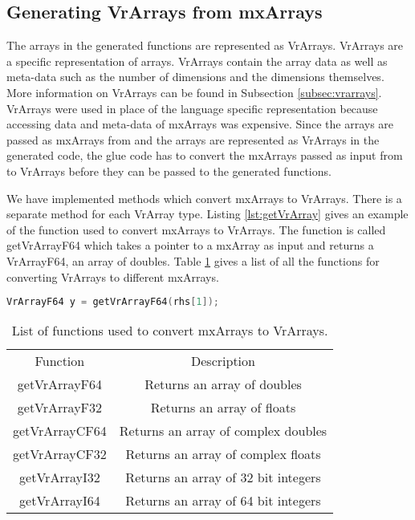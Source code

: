 \subsection{Generating VrArrays from mxArrays}
The arrays in the generated functions are represented as VrArrays. VrArrays are a \velocty specific representation of arrays. VrArrays contain the array data as well as meta-data such as the number of dimensions and the dimensions themselves. More information on VrArrays can be found in Subsection \ref{subsec:vrarrays}. VrArrays were used in place of the language specific representation because accessing data and meta-data of mxArrays was expensive. Since the arrays are passed as mxArrays from \matlab and the arrays are represented as VrArrays in the generated code, the glue code has to convert the mxArrays passed as input from \matlab to VrArrays before they can be passed to the generated functions. 

We have implemented methods which convert mxArrays to VrArrays. There is a separate method for each VrArray type. Listing \ref{lst:getVrArray} gives an example of the function used to convert mxArrays to VrArrays. The function is called getVrArrayF64 which takes a pointer to a mxArray as input and returns a VrArrayF64, an array of doubles. Table \ref{tab:getVrArray} gives a list of all the functions for converting VrArrays to different mxArrays. 

\begin{lstlisting}[language=c,caption={Converting mxArrays to VrArrays},label={lst:getVrArray}]
VrArrayF64 y = getVrArrayF64(rhs[1]);
\end{lstlisting}

\begin{table}[htbp]
\centering
\begin{tabular}{|c|c|}
\hline
Function       & Description                         \\ \hhline{|=|=|}
getVrArrayF64  & Returns an array of doubles         \\ \hline
getVrArrayF32  & Returns an array of floats          \\ \hline
getVrArrayCF64 & Returns an array of complex doubles \\ \hline
getVrArrayCF32 & Returns an array of complex floats  \\ \hline
getVrArrayI32  & Returns an array of 32 bit integers \\ \hline
getVrArrayI64  & Returns an array of 64 bit integers  \\ \hline
\end{tabular}
\caption{List of functions used to convert mxArrays to VrArrays.}
\label{tab:getVrArray}
\end{table}

